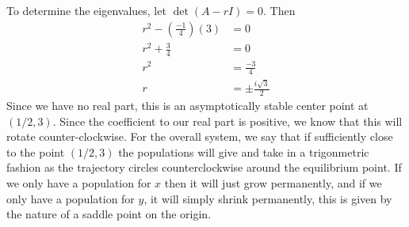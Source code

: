 \documentclass{article}
\theoremstyle{definition}
\begin{document}
        To determine the eigenvalues, let $\det(A - rI) = 0$. Then 
        \begin{align*}
            r^2 - (\frac{-1}{4})(3) &= 0 \\
            r^2 + \frac{3}{4} &= 0 \\
            r^2 &= \frac{-3}{4} \\
            r &= \pm \frac{i\sqrt{3}}{2} 
        \end{align*}
        Since we have no real part, this is an asymptotically stable center point at 
        $(1/2, 3)$. Since the coefficient to our real part is positive, we 
        know that this will rotate counter-clockwise.
        For the overall system, we say that if sufficiently close to 
        the point $(1/2, 3)$ the populations will give and take in a trigonmetric fashion 
        as the trajectory circles counterclockwise around the equilibrium point. 
        If we only have a population for $x$ then it will just 
        grow permanently, and if we only have a population for $y$,
        it will simply shrink permanently, this is given by the nature of a saddle point on the origin.
\end{document}
